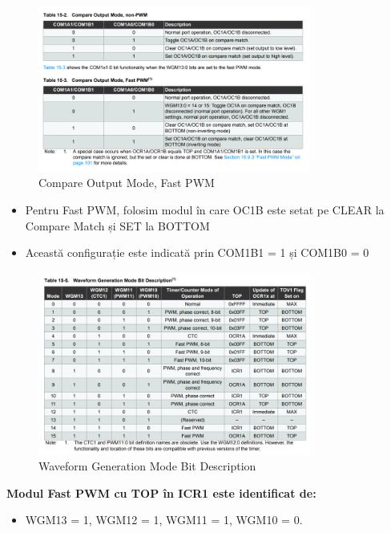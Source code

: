 \documentclass{report}
\begin{document}
\begin{figure}[H]
    \centering
    \includegraphics[width=0.8\textwidth]{NONpwm&PWM.png}
    \caption{Compare Output Mode, Fast PWM}
    \label{fig:FastPwm}
\end{figure}
\begin{itemize}
    \item Pentru Fast PWM, folosim modul în care OC1B este setat pe CLEAR la Compare Match și SET la BOTTOM
    \item Această configurație este indicată prin COM1B1 = 1 și COM1B0 = 0
\end{itemize}
\newpage
\vspace*{1cm}
\begin{figure}[H]
    \centering
    \includegraphics[width=0.8\textwidth]{waveformGeneration.png}
    \caption{Waveform Generation Mode Bit Description}
    \label{fig:waveform}
\end{figure}

\textbf{Modul Fast PWM cu TOP în ICR1 este identificat de:}
 \begin{itemize}
     \item WGM13 = 1, WGM12 = 1, WGM11 = 1, WGM10 = 0.
 \end{itemize}
\end{document}
